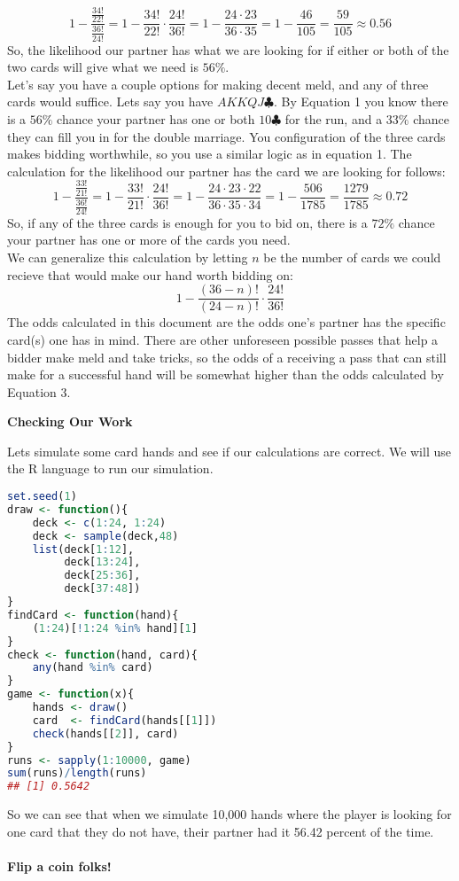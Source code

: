 \documentclass[11pt]{article}
\begin{document}
\begin{equation}
1-\frac{\frac{34!}{22!}}{\frac{36!}{24!}}=1-\frac{34!}{22!}\cdot \frac{24!}{36!}=1-\frac{24\cdot23}{36\cdot35}=1-\frac{46}{105}=\frac{59}{105}\approx 0.56
\end{equation}
So, the likelihood our partner has what we are looking for if either or both of the two cards will give what we need is $56\%$.\\
\indent Let's say you have a couple options for making decent meld, and any of three cards would suffice. Lets say you have $AKKQJ\clubsuit$. By Equation 1 you know there is a $56\%$ chance your partner has one or both $10\clubsuit$ for the run, and a $33\%$ chance they can fill you in for the double marriage. You configuration of the three cards makes bidding worthwhile, so you use a similar logic as in equation 1. The calculation for the likelihood our partner has the card we are looking for follows:
\begin{equation}
 1-\frac{\frac{33!}{21!}}{\frac{36!}{24!}}=1-\frac{33!}{21!}\cdot \frac{24!}{36!}=1-\frac{24\cdot 23\cdot 22}{36\cdot 35\cdot 34}=1-\frac{506}{1785}=\frac{1279}{1785}\approx 0.72
\end{equation}
So, if any of the three cards is enough for you to bid on, there is a $72\%$ chance your partner has one or more of the cards you need.\\
\indent We can generalize this calculation by letting $n$ be the number of cards we could recieve that would make our hand worth bidding on:
\begin{equation}
1-\frac{(36-n)!}{(24-n)!}\cdot \frac{24!}{36!}
\end{equation}
The odds calculated in this document are the odds one's partner has the specific card(s) one has in mind. There are other unforeseen possible passes that help a bidder make meld and take tricks, so the odds of a receiving a pass that can still make for a successful hand will be somewhat higher than the odds calculated by Equation 3.\\
\begin{center}
  \textbf{Checking Our Work}
\end{center}
Lets simulate some card hands and see if our calculations are correct.
We will use the R language to run our simulation.
\begin{lstlisting}[language=R]
set.seed(1)
draw <- function(){
    deck <- c(1:24, 1:24)
    deck <- sample(deck,48)
    list(deck[1:12],
         deck[13:24],
         deck[25:36],
         deck[37:48])
}
findCard <- function(hand){
    (1:24)[!1:24 %in% hand][1]
}
check <- function(hand, card){
    any(hand %in% card)
}
game <- function(x){
    hands <- draw()
    card  <- findCard(hands[[1]])
    check(hands[[2]], card)
}
runs <- sapply(1:10000, game)
sum(runs)/length(runs)
## [1] 0.5642
\end{lstlisting}
So we can see that when we simulate 10,000 hands where the player is looking for one card that they do not have, their partner had it 56.42 percent of the time.\\
\\
\textbf{Flip a coin folks!}
\end{document}
